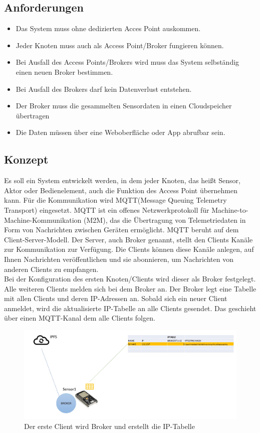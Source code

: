 \documentclass{article}
\begin{document}
\subsection{Anforderungen}
\begin{itemize}
    \item Das System muss ohne dedizierten Acces Point auskommen.
    \item Jeder Knoten muss auch als Access Point/Broker fungieren können.
    \item Bei Ausfall des Access Points/Brokers wird muss das System selbständig einen neuen Broker bestimmen.
    \item Bei Ausfall des Brokers darf kein Datenverlust entstehen.
    \item Der Broker muss die gesammelten Sensordaten in einen Cloudspeicher übertragen
    \item Die Daten müssen über eine Weboberfläche oder App abrufbar sein.

\end{itemize}
\subsection{Konzept}
Es soll ein System entwickelt werden, in dem jeder Knoten, das heißt Sensor, Aktor oder Bedienelement, auch die Funktion des Access Point übernehmen kann. Für die Kommunikation wird MQTT(Message Queuing Telemetry Transport) eingesetzt. MQTT ist ein offenes Netzwerkprotokoll für Machine-to-Machine-Kommunikation (M2M), das die Übertragung von Telemetriedaten in Form von Nachrichten zwischen Geräten ermöglicht.
MQTT beruht auf dem Client-Server-Modell. Der Server, auch Broker genannt, stellt den Clients Kanäle zur Kommunikation zur Verfügung. Die Clients können diese Kanäle anlegen, auf Ihnen Nachrichten veröffentlichen und sie abonnieren, um Nachrichten von anderen Clients zu empfangen. 
\\

Bei der Konfiguration des ersten Knoten/Clients wird dieser als Broker festgelegt. Alle weiteren Clients melden sich bei dem Broker an. Der Broker legt eine Tabelle mit allen Clients und deren IP-Adressen an. Sobald sich ein neuer Client anmeldet, wird die aktualisierte IP-Tabelle an alle Clients gesendet. Das geschieht über einen MQTT-Kanal dem alle Clients folgen.

\begin{figure}[h]
    \centering
    \includegraphics[width=1\linewidth]{Porposal/bild1.jpg}
    \caption{Der erste Client wird Broker und erstellt die IP-Tabelle}
    \label{fig:statemachine}
\end{figure}
\end{document}
